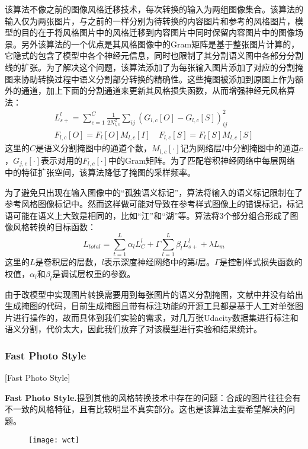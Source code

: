 该算法不像之前的图像风格迁移技术，每次转换的输入为两组图像集合。该算法的输入仅为两张图片，与之前的一样分别为待转换的内容图片和参考的风格图片，模型的目的在于将风格图片中的风格迁移到内容图片中同时保留内容图片中的图像场景。另外该算法的一个优点是其风格图像中的Gram矩阵是基于整张图片计算的，它隐式的包含了模型中各个神经元信息，同时也限制了其分割语义图中各部分分割线的扩张。为了解决这个问题，该算法添加了为每张输入图片添加了对应的分割掩图来协助转换过程中语义分割部分转换的精确性。这些掩图被添加到原图上作为额外的通道，加上下面的分割通道来更新其风格损失函数，从而增强神经元风格算法：
\begin{gather*}
L_{s+}^l=\sum_{c=1}^C \frac{1}{2N_{l,c}^2}\sum_{ij}(G_{l,c}[O]-G_{l,c}[S])_{ij}^2\\
F_{l,c}[O]=F_l[O]M_{l,c}[I]\quad F_{l,c}[S]=F_l[S]M_{l,c}[S]
\end{gather*}
这里的$C$是语义分割掩图中的通道个数，$M_{l,c}[\cdot]$记为网络层$l$中分割掩图中的通道$c$，$G_{j,c}[\cdot]$表示对用的$F_{l,c}[\cdot]$中的Gram矩阵。为了匹配卷积神经网络中每层网络中的特征扩张空间，该算法降低了掩图的采样频率。

为了避免只出现在输入图像中的“孤独语义标记”，算法将输入的语义标记限制在了参考风格图像标记中。然而这样做可能对导致在参考样式图像上的错误标记，标记语可能在语义上大致是相同的，比如“江”和“湖”等。算法将3个部分组合形成了图像风格转换的目标函数：
$$L_{total}=\sum_{t=1}^L\alpha_lL_C^l+\Gamma\sum_{l=1}^L \beta_lL_{s+}^l +\lambda L_m$$
这里的$L$是卷积层的层数，$l$表示深度神经网络中的第$l$层。$\Gamma$是控制样式损失函数的权值，$\alpha_l$和$\beta_l$是调试层权重的参数。

由于改模型中实现图片转换需要用到每张图片的语义分割掩图，文献\cite{dpst}中并没有给出生成掩图的代码，目前生成掩图且带有标注功能的开源工具都是基于人工对单张图片进行操作的，故而具体到我们实验的需求，对几万张Udacity数据集进行标注和语义分割，代价太大，因此我们放弃了对该模型进行实验和结果统计。


\subsubsection{Fast Photo Style}[Fast Photo Style]

\textbf{Fast Photo Style.}\cite{fps}\quad  提到其他的风格转换技术中存在的问题：合成的图片往往会有不一致的风格特征，且有比较明显不真实部分。这也是该算法主要希望解决的问题。

\begin{figure}[t]
    \centering
    \texttt{[image: wct]}
    \caption{}
    \label{wctf}
\end{figure}


